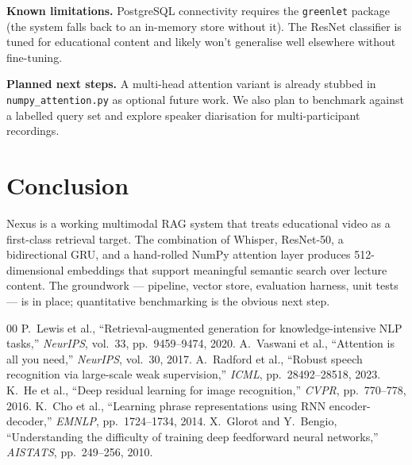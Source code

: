 \documentclass[conference]{IEEEtran}
\begin{document}
\noindent\textbf{Known limitations.} PostgreSQL connectivity requires the
\texttt{greenlet} package (the system falls back to an in-memory store
without it). The ResNet classifier is tuned for educational content and
likely won't generalise well elsewhere without fine-tuning.

\noindent\textbf{Planned next steps.} A multi-head attention variant
is already stubbed in \texttt{numpy\_attention.py} as optional future
work. We also plan to benchmark against a labelled query set and explore
speaker diarisation for multi-participant recordings.

\section{Conclusion}
Nexus is a working multimodal RAG system that treats educational video as
a first-class retrieval target. The combination of Whisper, ResNet-50, a
bidirectional GRU, and a hand-rolled NumPy attention layer produces
512-dimensional embeddings that support meaningful semantic search over
lecture content. The groundwork --- pipeline, vector store, evaluation
harness, unit tests --- is in place; quantitative benchmarking is the
obvious next step.

\begin{thebibliography}{00}
 P.~Lewis et al., ``Retrieval-augmented generation for knowledge-intensive NLP tasks,'' \textit{NeurIPS}, vol.~33, pp.~9459--9474, 2020.
 A.~Vaswani et al., ``Attention is all you need,'' \textit{NeurIPS}, vol.~30, 2017.
 A.~Radford et al., ``Robust speech recognition via large-scale weak supervision,'' \textit{ICML}, pp.~28492--28518, 2023.
 K.~He et al., ``Deep residual learning for image recognition,'' \textit{CVPR}, pp.~770--778, 2016.
 K.~Cho et al., ``Learning phrase representations using RNN encoder-decoder,'' \textit{EMNLP}, pp.~1724--1734, 2014.
 X.~Glorot and Y.~Bengio, ``Understanding the difficulty of training deep feedforward neural networks,'' \textit{AISTATS}, pp.~249--256, 2010.
\end{thebibliography}
\end{document}
